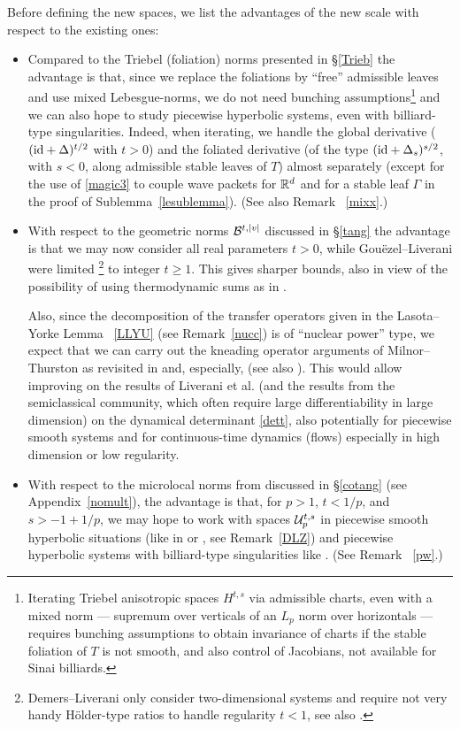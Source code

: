 \documentclass[10pt,twoside]{amsart}
\begin{document}
 


Before defining the new spaces, we list the advantages of the new scale with respect to
the existing ones:



\begin{itemize}
\item
Compared to the Triebel (foliation) norms \cite{BCinfty,BG1,BG2} presented in \S\ref{Trieb} the advantage
is that, since we replace the foliations by ``free'' admissible leaves
and use mixed Lebesgue-norms, we do not need bunching assumptions\footnote{Iterating Triebel anisotropic spaces $H^{t,s}$ via admissible charts, even with a 
mixed norm --- supremum over verticals
of an $L_p$ norm over horizontals --- requires bunching assumptions 
\cite{BG2} to obtain invariance
of charts if the stable foliation of $T$ is not
smooth, and also control of Jacobians, not
available  for Sinai billiards.} and we can also hope
to study piecewise hyperbolic systems, even with billiard-type singularities.
Indeed, when iterating,  we handle
 the global derivative ($(\mathrm{id} +\Delta)^{t/2}$ with $t>0$) and
the foliated derivative (of the type $(\mathrm{id} +\Delta_s)^{s/2}$, with $s<0$, along admissible stable
leaves of $T$)  almost separately (except  for the use of \eqref{magic3} to couple wave packets
for $\mathbb{R}^d$ and for a stable leaf $\Gamma$ in the proof of
Sublemma~\ref{lesublemma}). (See also Remark~ \ref{mixx}.)
\item
With respect to the geometric norms $\mathcal{B}^{t,|v|}$
discussed in \S\ref{tang} the advantage is that we may now consider all real parameters  $t>0$,
while Gou\"ezel--Liverani \cite{GL1,GL2} were 
limited \footnote{Demers--Liverani \cite{DL} only consider two-dimensional
systems and require  not very handy H\"older-type ratios to handle regularity  $t <1$,
see also \cite{DZ,BDL}.} to integer $t\ge 1$. This gives sharper bounds, also in view of the
possibility of using thermodynamic sums as in \cite{BT2}.

Also, since the decomposition of the transfer operators given in the Lasota--Yorke
Lemma ~\ref{LLYU} (see Remark~\ref{nucc})
is of ``nuclear power'' type, we expect 
that we can carry out the kneading operator
arguments of Milnor--Thurston \cite{MT} as revisited
in \cite{BaRu} and, especially, \cite{BT2} (see also \cite{Ba}). This 
would allow improving  on the results 
of Liverani et al. \cite{LTzeta} (and the results from the semiclassical community, which often
require large differentiability in large dimension) on the
dynamical determinant \eqref{dett}, also potentially for
piecewise smooth systems and 
for continuous-time dynamics (flows) especially in high dimension or low regularity.
\item
With respect to the microlocal
norms from \cite{BT1, BT2, FRS} discussed in \S\ref{cotang} (see  Appendix~\ref{nomult}), 
the advantage is that, for $p>1$, $t<1/p$, and $s>-1+1/p$,
we may hope to work with spaces $\mathcal{U}^{t,s}_p$ in piecewise smooth hyperbolic situations (like in \cite{DL}
or \cite{DZ}, see Remark~\ref{DLZ})
and piecewise hyperbolic systems with billiard-type singularities like \cite{DZ,BDL}.
(See Remark~ \ref{pw}.)


\end{itemize}
\end{document}
